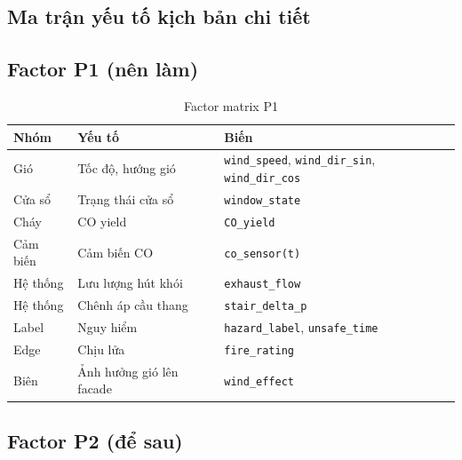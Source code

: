 
\begin{appendices}

\chapter{Ma trận yếu tố kịch bản chi tiết}
\label{app:factormatrix}

\section{Factor P1 (nên làm)}

\begin{table}[H]
\centering
\caption{Factor matrix P1}
\label{tab:factorP1}
\begin{tabularx}{\textwidth}{l l X}
\toprule
\textbf{Nhóm} & \textbf{Yếu tố} & \textbf{Biến} \\
\midrule
Gió     & Tốc độ, hướng gió        & \texttt{wind\_speed}, \texttt{wind\_dir\_sin}, \texttt{wind\_dir\_cos} \\
Cửa sổ  & Trạng thái cửa sổ       & \texttt{window\_state} \\
Cháy    & CO yield                  & \texttt{CO\_yield} \\
Cảm biến & Cảm biến CO              & \texttt{co\_sensor(t)} \\
Hệ thống & Lưu lượng hút khói      & \texttt{exhaust\_flow} \\
Hệ thống & Chênh áp cầu thang      & \texttt{stair\_delta\_p} \\
Label    & Nguy hiểm                & \texttt{hazard\_label}, \texttt{unsafe\_time} \\
Edge     & Chịu lửa                 & \texttt{fire\_rating} \\
Biên     & Ảnh hưởng gió lên facade & \texttt{wind\_effect} \\
\bottomrule
\end{tabularx}
\end{table}

\section{Factor P2 (để sau)}


\end{appendices}
